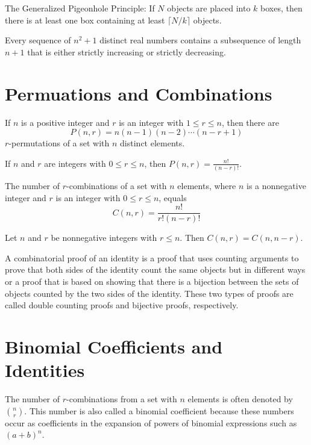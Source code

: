 \documentclass[../discrete.tex]{subfiles}
\begin{document}
\begin{theorem}
    The Generalized Pigeonhole Principle: If $N$ objects are placed into $k$ boxes, then 
    there is at least one box containing at least $\lceil N/k \rceil$ objects.
\end{theorem}

\begin{theorem}
    Every sequence of $n^2+1$ distinct real numbers contains a subsequence of length $n+1$ that is either strictly increasing or strictly decreasing.
\end{theorem}
\section{Permuations and Combinations}
\begin{theorem}
    If $n$ is a positive integer and $r$ is an integer with $1\leq r\leq n$, then there are 
    \[P(n,r)=n(n-1)(n-2)\cdots(n-r+1)\]
    $r$-permutations of a set with $n$ distinct elements.
\end{theorem}

\begin{corollary}
    If $n$ and $r$ are integers with $0\leq r\leq n$, then $P(n,r)=\frac{n!}{(n-r)!}$.
\end{corollary}

\begin{theorem}
    The number of $r$-combinations of a set with $n$ elements, where $n$ is a nonnegative integer
    and $r$ is an integer with $0\leq r\leq n$, equals 
    \[C(n,r)=\frac{n!}{r!(n-r)!}\]
\end{theorem}

\begin{corollary}
    Let $n$ and $r$ be nonnegative integers with $r\leq n$. Then $C(n,r)=C(n,n-r)$.
\end{corollary}

\begin{definition}
    A combinatorial proof of an identity is a proof that uses counting arguments to prove that 
    both sides of the identity count the same objects but in different ways or a proof that is based 
    on showing that there is a bijection between the sets of objects counted by the two sides of the identity.
    These two types of proofs are called double counting proofs and bijective proofs, respectively.
\end{definition}


\section{Binomial Coefficients and Identities}
The number of $r$-combinations from a set with $n$ elements is often denoted by $\binom{n}{r}$. This number is also called a binomial 
coefficient because these numbers occur as coefficients in the expansion of powers of binomial expressions such as 
$(a+b)^n$.
\end{document}
